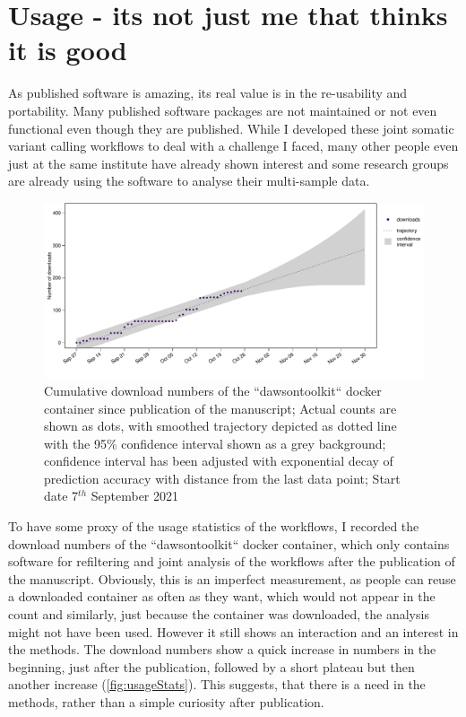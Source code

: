 \section[Usage]{Usage - its not just me that thinks it is good}
As published software is amazing, its real value is in the re-usability and portability. Many published software packages are not maintained or not even functional even though they are published. While I developed these joint somatic variant calling workflows to deal with a challenge I faced, many other people even just at the same institute have already shown interest and some research groups are already using the software to analyse their multi-sample data.

\begin{figure}[!ht]
\centering
\includegraphics[width=.99\linewidth]{Figures/dawsontoolkitDownloads.pdf}
\caption[Usage statistics joint workflows]{Cumulative download numbers of the ``dawsontoolkit`` docker container since publication of the manuscript; Actual counts are shown as dots, with smoothed trajectory depicted as dotted line with the 95\% confidence interval shown as a grey background; confidence interval has been adjusted with exponential decay of prediction accuracy with distance from the last data point; Start date 7$^{th}$ September 2021}\label{fig:usageStats}
\end{figure}

To have some proxy of the usage statistics of the workflows, I recorded the download numbers of the ``dawsontoolkit`` docker container, which only contains software for refiltering and joint analysis of the workflows after the publication of the manuscript. Obviously, this is an imperfect measurement, as people can reuse a downloaded container as often as they want, which would not appear in the count and similarly, just because the container was downloaded, the analysis might not have been used. However it still shows  an interaction and an interest in the methods. The download numbers show a quick increase in numbers in the beginning, just after the publication, followed by a short plateau  but then another increase (\autoref{fig:usageStats}). This suggests, that there is a need in the methods, rather than a simple curiosity after publication. 

